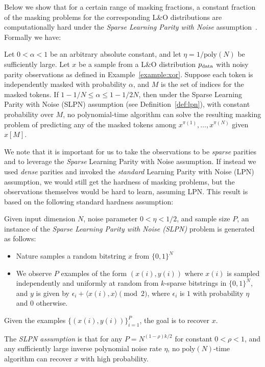 Below we show that for a certain range of masking fractions, a constant fraction of the masking problems for the corresponding L\&O distributions are computationally hard under the \emph{Sparse Learning Parity with Noise} assumption~\cite{alekhnovich2003more}. Formally we have:

\begin{proposition}\label{prop:lpn}
    Let $0 < \alpha < 1$ be an arbitrary absolute constant, and let $\eta = 1/\mathrm{poly}(N)$ be sufficiently large. Let $x$ be a sample from a L\&O distribution $p_{\rm data}$ with noisy parity observations as defined in Example~\ref{example:xor}. Suppose each token is independently masked with probability $\alpha$, and $M$ is the set of indices for the masked tokens. If $1 - 1/N \le \alpha \le 1 - 1/2N$, then under the Sparse Learning Parity with Noise (SLPN) assumption (see Definition~\ref{def:lpn}), with constant probability over $M$, no polynomial-time algorithm can solve the resulting masking problem of predicting any of the masked tokens among $x^{\pi(1)}, \ldots, x^{\pi(N)}$ given $x[M]$.
\end{proposition}

We note that it is important for us to take the observations to be \emph{sparse} parities and to leverage the \emph{Sparse} Learning Parity with Noise assumption. If instead we used \emph{dense} parities and invoked the \emph{standard} Learning Parity with Noise (LPN) assumption, we would still get the hardness of masking problems, but the observations themselves would be hard to learn, assuming LPN. This result is based on the following standard hardness assumption:

\begin{definition}\label{def:lpn}
    Given input dimension $N$, noise parameter $0 < \eta < 1/2$, and sample size $P$, an instance of the \emph{Sparse Learning Parity with Noise (SLPN)} problem is generated as follows:
    \begin{itemize}
        \item Nature samples a random bitstring $x$ from $\{0,1\}^N$
        \item We observe $P$ examples of the form $(x{(i)},y{(i)})$ where $x{(i)}$ is sampled independently and uniformly at random from $k$-sparse bitstrings in $\{0,1\}^N$, and $y$ is given by $\epsilon_i + \langle x{(i)}, x\rangle \pmod{2}$, where $\epsilon_i$ is $1$ with probability $\eta$ and $0$ otherwise.
    \end{itemize}
    Given the examples $\{(x{(i)},y{(i)})\}^P_{i=1}$, the goal is to recover $x$.

    The \emph{SLPN assumption} is that for any $P = N^{(1 - \rho)k/2}$ for constant $0 < \rho < 1$, and any sufficiently large inverse polynomial noise rate $\eta$, no $\mathrm{poly}(N)$-time algorithm can recover $x$ with high probability.
\end{definition}

